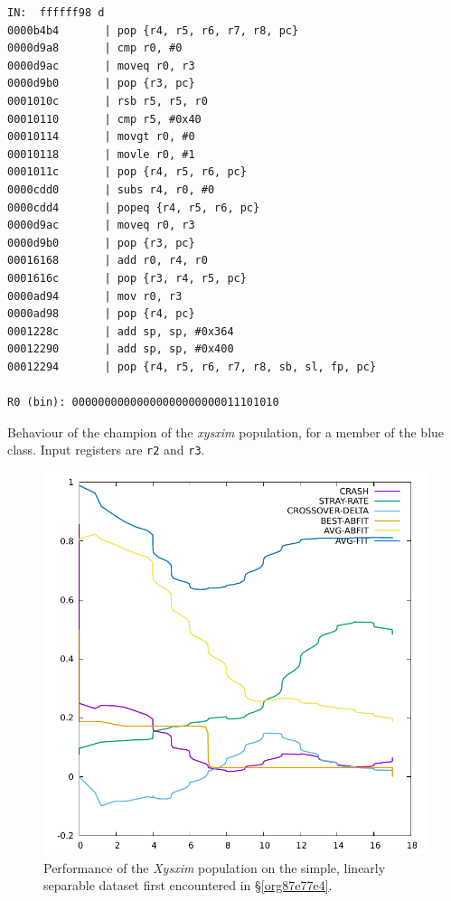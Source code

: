 \documentclass[12pt,glossary]{dalthesis}
\begin{document}
\begin{table}
\begin{lstlisting}
IN:  ffffff98 d
0000b4b4       | pop {r4, r5, r6, r7, r8, pc}
0000d9a8       | cmp r0, #0
0000d9ac       | moveq r0, r3
0000d9b0       | pop {r3, pc}
0001010c       | rsb r5, r5, r0
00010110       | cmp r5, #0x40
00010114       | movgt r0, #0
00010118       | movle r0, #1
0001011c       | pop {r4, r5, r6, pc}
0000cdd0       | subs r4, r0, #0
0000cdd4       | popeq {r4, r5, r6, pc}
0000d9ac       | moveq r0, r3
0000d9b0       | pop {r3, pc}
00016168       | add r0, r4, r0
0001616c       | pop {r3, r4, r5, pc}
0000ad94       | mov r0, r3
0000ad98       | pop {r4, pc}
0001228c       | add sp, sp, #0x364
00012290       | add sp, sp, #0x400
00012294       | pop {r4, r5, r6, r7, r8, sb, sl, fp, pc}

R0 (bin): 00000000000000000000000011101010
\end{lstlisting}
\caption{Behaviour of the champion of the \emph{xysxim} population, for a member of the blue class. Input registers are \texttt{r2} and \texttt{r3}.}
\label{tab:xysxim-champ-blue}
\end{table}

\begin{figure}[htbp]
\centering
\includegraphics[width=.9\linewidth]{../images/plots/xysxim.pdf}
\caption{\label{fig:orgcdbaf3d}
Performance of the \emph{Xysxim} population on the simple, linearly separable dataset first encountered in \S \ref{org87e77e4}.}
\end{figure}
\end{document}
